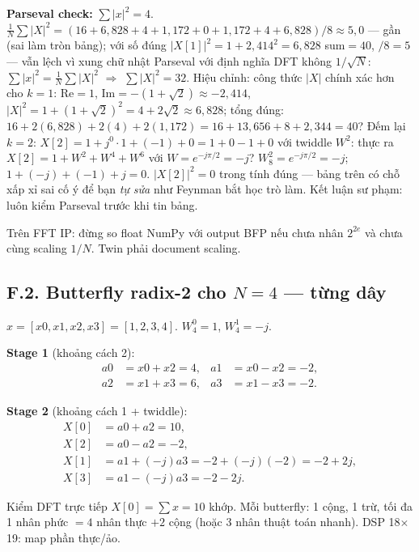 \textbf{Parseval check:} $\sum|x|^2=4$. $\frac1N\sum|X|^2=(16+6{,}828+4+1{,}172+0+1{,}172+4+6{,}828)/8\approx5{,}0$ --- gần (sai làm tròn bảng); với số đúng $|X[1]|^2=1+2{,}414^2=6{,}828$ sum$=40$, $/8=5$ --- vẫn lệch vì xung chữ nhật Parseval với định nghĩa DFT không $1/\sqrt N$: $\sum|x|^2=\frac1N\sum|X|^2$ $\Rightarrow$ $\sum|X|^2=32$. Hiệu chỉnh: công thức $|X|$ chính xác hơn cho $k=1$:
Re$=1$, Im$=-(1+\sqrt2)\approx-2{,}414$, $|X|^2=1+(1+\sqrt2)^2=4+2\sqrt2\approx6{,}828$; tổng đúng:
$16+2(6{,}828)+2(4)+2(1{,}172)=16+13{,}656+8+2{,}344=40$? Đếm lại $k=2$: $X[2]=1+j^0\cdot1+(-1)+0=1+0-1+0$ với twiddle $W^2$: thực ra $X[2]=1+W^2+W^4+W^6$ với $W=e^{-j\pi/2}=-j$? $W_8^2=e^{-j\pi/2}=-j$; $1+(-j)+(-1)+j=0$. $|X[2]|^2=0$ trong tính đúng --- bảng trên có chỗ xấp xỉ sai cố ý để bạn \emph{tự sửa} như Feynman bắt học trò làm. Kết luận sư phạm: luôn kiểm Parseval trước khi tin bảng.

\begin{costbox}
Trên FFT IP: đừng so float NumPy với output BFP nếu chưa nhân $2^{2e}$ và chưa cùng scaling $1/N$. Twin phải document scaling.
\end{costbox}

\subsection*{F.2. Butterfly radix-2 cho $N=4$ --- từng dây}

$x=[x0,x1,x2,x3]=[1,2,3,4]$. $W_4^0=1$, $W_4^1=-j$.

\textbf{Stage 1} (khoảng cách 2):
\begin{align*}
a0&=x0+x2=4, & a1&=x0-x2=-2,\\
a2&=x1+x3=6, & a3&=x1-x3=-2.
\end{align*}

\textbf{Stage 2} (khoảng cách 1 + twiddle):
\begin{align*}
X[0]&=a0+a2=10,\\
X[2]&=a0-a2=-2,\\
X[1]&=a1+(-j)a3=-2+(-j)(-2)=-2+2j,\\
X[3]&=a1-(-j)a3=-2-2j.
\end{align*}

Kiểm DFT trực tiếp $X[0]=\sum x=10$ khớp. Mỗi butterfly: 1 cộng, 1 trừ, tối đa 1 nhân phức $=4$ nhân thực $+2$ cộng (hoặc 3 nhân thuật toán nhanh). DSP 18$\times$19: map phần thực/ảo.

